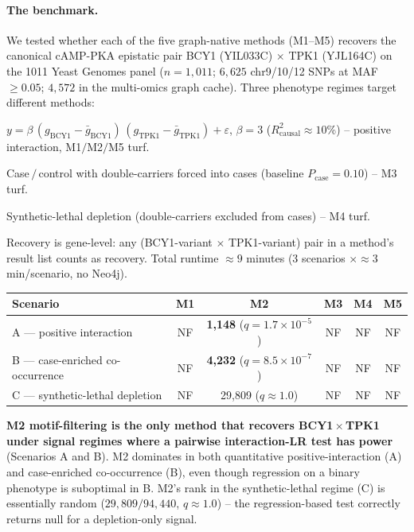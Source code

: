 \paragraph{The benchmark.}
We tested whether each of the five graph-native methods (M1--M5) recovers
the canonical cAMP-PKA epistatic pair BCY1 (YIL033C) $\times$ TPK1
(YJL164C) on the 1011 Yeast Genomes panel ($n=1{,}011$; $6{,}625$
chr9/10/12 SNPs at MAF$\geq 0.05$; $4{,}572$ in the multi-omics graph
cache). Three phenotype regimes target different methods:

\begin{description}\setlength{\itemsep}{0pt}
\item[Scenario A]  $y = \beta\,(g_{\mathrm{BCY1}}-\bar g_{\mathrm{BCY1}})\,(g_{\mathrm{TPK1}}-\bar g_{\mathrm{TPK1}})+\varepsilon$, $\beta=3$ ($R^2_{\mathrm{causal}}\approx 10$\%) -- positive interaction, M1$/$M2$/$M5 turf.
\item[Scenario B]  Case$\,/\,$control with double-carriers forced into cases (baseline $P_{\mathrm{case}}=0.10$) -- M3 turf.
\item[Scenario C]  Synthetic-lethal depletion (double-carriers excluded from cases) -- M4 turf.
\end{description}

Recovery is gene-level: any (BCY1-variant $\times$ TPK1-variant) pair in
a method's result list counts as recovery. Total runtime $\approx 9$
minutes (3 scenarios $\times \approx 3$ min/scenario, no Neo4j).

\begin{center}\small
\begin{tabular}{lccccc}
\toprule
Scenario                          & M1 & M2                 & M3 & M4 & M5\\
\midrule
A — positive interaction          & NF & \textbf{1{,}148} ($q=1.7\times10^{-5}$) & NF & NF & NF\\
B — case-enriched co-occurrence   & NF & \textbf{4{,}232} ($q=8.5\times10^{-7}$) & NF & NF & NF\\
C — synthetic-lethal depletion    & NF & 29{,}809 ($q\approx 1.0$) & NF & NF & NF\\
\bottomrule
\end{tabular}
\end{center}

\textbf{M2 motif-filtering is the only method that recovers BCY1\,$\times$\,TPK1
under signal regimes where a pairwise interaction-LR test has power}
(Scenarios A and B). M2 dominates in both quantitative
positive-interaction (A) and case-enriched co-occurrence (B), even
though regression on a binary phenotype is suboptimal in B. M2's rank
in the synthetic-lethal regime (C) is essentially random
($29{,}809/94{,}440$, $q\approx 1.0$) -- the regression-based test
correctly returns null for a depletion-only signal.

